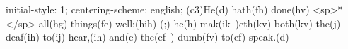 initial-style: 1;
centering-scheme: english;
(c3)He(d) hath(fh) done(hv) <sp>*</sp> all(hg) things(fe) well:(hih) (;) he(h) mak(ik~)eth(kv) both(kv) the(j) deaf(ih) to(ij) hear,(ih) and(e) the(ef~) dumb(fv) to(ef) speak.(d)
